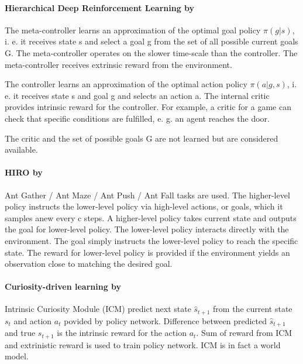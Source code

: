 \documentclass[acmsmall, nonacm]{acmart}
\begin{document}

\paragraph{Hierarchical Deep Reinforcement Learning by~\citet{Kulkarni2016HierarchicalDR}} %
\label{par:hierarchical_deep_rl}

The meta-controller learns an approximation of the optimal goal policy $\pi(g|s)$, i. e. it receives state s and select a goal g from the set of all possible current goals G. The meta-controller operates on the slower time-scale than the controller. The meta-controller receives extrinsic reward from the environment.

The controller learns an approximation of the optimal action policy $\pi(a|g,s)$, i. e. it receives state s and goal g and selects an action a. The internal critic provides intrinsic reward for the controller. For example, a critic for a game can check that specific conditions are fulfilled, e. g. an agent reaches the door.

The critic and the set of possible goals G are not learned but are considered available.


\paragraph{HIRO by~\citet{Nachum2018DataEfficientHR}} %
\label{par:hiro}

Ant Gather / Ant Maze / Ant Push / Ant Fall tasks are used. The higher-level policy instructs the lower-level policy via high-level actions, or goals, which it samples anew every c steps. A higher-level policy takes current state and outputs the goal for lower-level policy. The lower-level policy interacts directly with the environment. The goal simply instructs the lower-level policy to reach the specific state. The reward for lower-level policy is provided if the environment yields an observation close to matching the desired goal.


\paragraph{Curiosity-driven learning by~\citet{pathak_curiosity-driven_2017}} %
\label{par:curiosity_driven_rl}

Intrinsic Curiosity Module (ICM) predict next state $\hat{s}_{t+1}$ from the current state $s_t$ and action $a_t$ povided by policy network. Difference between predicted $\hat{s}_{t+1}$ and true $s_{t+1}$ is the intrinsic reward for the action $a_t$. Sum of reward from ICM and extrinistic reward is used to train policy network. ICM is in fact a world model.
\end{document}
